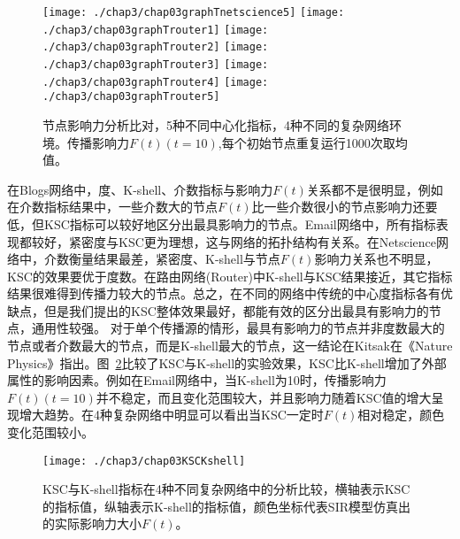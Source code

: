 \addtocounter{figure}{-1}       %
\begin{figure}[H]
	\addtocounter{figure}{1}
	\centering%
	\subcaptionbox{\label{fig:chap03graphTnetscience5}}
	{\texttt{[image: ./chap3/chap03graphTnetscience5]}}
	\subcaptionbox{\label{fig:chap03graphTrouter1}}
	{\texttt{[image: ./chap3/chap03graphTrouter1]}}	
	\subcaptionbox{\label{fig:chap03graphTrouter2}}
	{\texttt{[image: ./chap3/chap03graphTrouter2]}}
	\subcaptionbox{\label{fig:chap03graphTrouter3}}
	{\texttt{[image: ./chap3/chap03graphTrouter3]}}
	\subcaptionbox{\label{fig:chap03graphTrouter4}}
	{\texttt{[image: ./chap3/chap03graphTrouter4]}}
	\subcaptionbox{\label{fig:chap03graphTrouter5}}
	{\texttt{[image: ./chap3/chap03graphTrouter5]}}
	\caption{节点影响力分析比对，5种不同中心化指标，4种不同的复杂网络环境。传播影响力$F(t)(t=10)$,每个初始节点重复运行1000次取均值。}
	\label{fig:chap03ftall}
\end{figure}
在Blogs网络中，度、K-shell、介数指标与影响力$F(t)$关系都不是很明显，例如在介数指标结果中，一些介数大的节点$F(t)$比一些介数很小的节点影响力还要低，但KSC指标可以较好地区分出最具影响力的节点。Email网络中，所有指标表现都较好，紧密度与KSC更为理想，这与网络的拓扑结构有关系。在Netscience网络中，介数衡量结果最差，紧密度、K-shell与节点$F(t)$影响力关系也不明显，KSC的效果要优于度数。在路由网络(Router)中K-shell与KSC结果接近，其它指标结果很难得到传播力较大的节点。总之，在不同的网络中传统的中心度指标各有优缺点，但是我们提出的KSC整体效果最好，都能有效的区分出最具有影响力的节点，通用性较强。
对于单个传播源的情形，最具有影响力的节点并非度数最大的节点或者介数最大的节点，而是K-shell最大的节点，这一结论在Kitsak\cite{kitsak2010identification}在《Nature Physics》指出。图~\ref{fig:chap03KSCKshell}比较了KSC与K-shell的实验效果，KSC比K-shell增加了外部属性的影响因素。例如在Email网络中，当K-shell为10时，传播影响力$F(t)(t=10)$并不稳定，而且变化范围较大，并且影响力随着KSC值的增大呈现增大趋势。在4种复杂网络中明显可以看出当KSC一定时$F(t)$相对稳定，颜色变化范围较小。
\begin{figure}[H] 
	\centering
	\texttt{[image: ./chap3/chap03KSCKshell]}
	\caption{KSC与K-shell指标在4种不同复杂网络中的分析比较，横轴表示KSC的指标值，纵轴表示K-shell的指标值，颜色坐标代表SIR模型仿真出的实际影响力大小$F(t)$。}
	\label{fig:chap03KSCKshell}
\end{figure}
